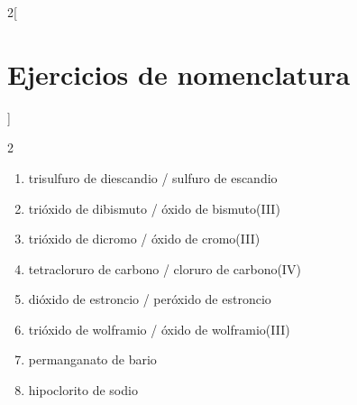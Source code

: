 \documentclass[10pt]{article}
\begin{document}
\begin{multicols*}{2}[
  \section{Ejercicios de nomenclatura}
  ]
\begin{exercise}[
    tags    = {inorgánica,nomenclatura,múltiple,2B},
    topics  = {química inorgánica,formulación,nomenclatura},
    source  = {Química 2B SAN 2016, p372, e11},
  ]
  \begin{enumerate}\begin{multicols}{2}
    \item {}
    \item {}
    \item {}
    \item {}
    \item {}
    \item {}
    \item {}
    \item {}
  \end{multicols}\end{enumerate}
\end{exercise}

\begin{solution}
  \begin{enumerate}
    \item trisulfuro de diescandio / sulfuro de escandio
    \item trióxido de dibismuto / óxido de bismuto(III)
    \item trióxido de dicromo / óxido de cromo(III)
    \item tetracloruro de carbono / cloruro de carbono(IV)
    \item dióxido de estroncio / peróxido de estroncio
    \item trióxido de wolframio / óxido de wolframio(III)
    \item permanganato de bario
    \item hipoclorito de sodio
  \end{enumerate}
\end{solution}

\end{multicols*}
\end{document}
